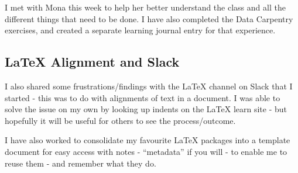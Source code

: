 \documentclass{article}
\begin{document}
I met with Mona this week to help her better understand the class and all the different things that need to be done. I have also completed the Data Carpentry exercises, and created a separate learning journal entry for that experience. 

\subsection{LaTeX Alignment and Slack}
\label{ Error: LaTeX Alignment}
I also shared some frustrations/findings with the LaTeX channel on Slack that I started - this was to do with alignments of text in a document. I was able to solve the issue on my own by looking up indents on the LaTeX learn site - but hopefully it will be useful for others to see the process/outcome.

I have also worked to consolidate my favourite LaTeX packages into a template document for easy access with notes - ``metadata'' if you will - to enable me to reuse them - and remember what they do. 
\end{document}
